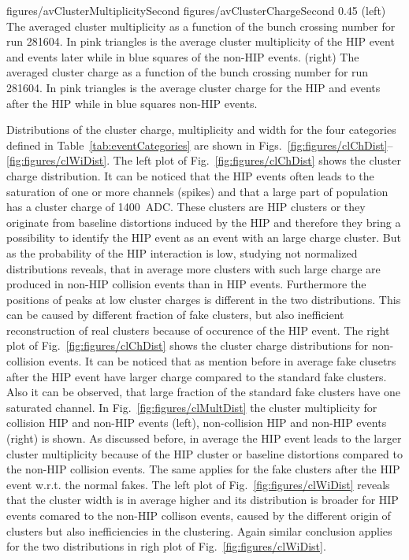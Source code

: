                  {figures/avClusterMultiplicitySecond} %
                 {figures/avClusterChargeSecond} %
                 {0.45}       %
                 {(left) The averaged cluster multiplicity as a function of the bunch crossing number for run 281604. In pink triangles is the average cluster multiplicity of the HIP event and events later while in blue squares of the non-HIP events. (right) The averaged cluster charge as a function of the bunch crossing number for run 281604. In pink triangles is the average cluster charge for the HIP and events after the HIP while in blue squares non-HIP events. } %



Distributions of the cluster charge, multiplicity and width for the four categories defined in Table~\ref{tab:eventCategories} are shown in Figs.~\ref{fig:figures/clChDist}--\ref{fig:figures/clWiDist}. The left plot of Fig.~\ref{fig:figures/clChDist} shows the cluster charge distribution. It can be noticed that the HIP events often leads to the saturation of one or more channels (spikes) and that  a large part of population has a cluster charge of 1400~ADC. These clusters are HIP clusters or they originate from baseline distortions induced by the HIP and therefore they bring a possibility to identify the HIP event as an event with an large charge cluster. But as the probability of the HIP interaction is low, studying not normalized distributions reveals, that in average more clusters with such large charge are produced in non-HIP collision events than in HIP events. Furthermore the positions of peaks at low cluster charges is different in the two distributions. This can be caused by different fraction of fake clusters, but also inefficient reconstruction of real clusters because of occurence of the HIP event. The right plot of Fig.~\ref{fig:figures/clChDist} shows the cluster charge distributions for non-collision events. It can be noticed that as mention before in average fake clusetrs after the HIP event have larger charge compared to the standard fake clusters. Also it can be observed, that large fraction of the standard fake clusters have one saturated channel. In Fig.~\ref{fig:figures/clMultDist} the cluster multiplicity for collision HIP and non-HIP events (left),  non-collision HIP and non-HIP events (right) is shown. As discussed before, in average the HIP event leads to the larger cluster multiplicity because of the HIP cluster or baseline distortions compared to the non-HIP collision events. The same applies for the fake clusters after the HIP event w.r.t. the normal fakes. The left plot of Fig.~\ref{fig:figures/clWiDist} reveals that the cluster width is in average higher and its distribution is broader for HIP events comared to the non-HIP collison events, caused by the different origin of clusters but also inefficiencies in the clustering. Again similar conclusion applies for the two distributions in righ plot of Fig.~\ref{fig:figures/clWiDist}.  

